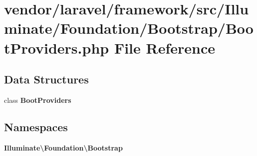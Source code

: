 \section{vendor/laravel/framework/src/\+Illuminate/\+Foundation/\+Bootstrap/\+Boot\+Providers.php File Reference}
\label{_boot_providers_8php}
\subsection*{Data Structures}
\begin{DoxyCompactItemize}
\item 
class {\bf Boot\+Providers}
\end{DoxyCompactItemize}
\subsection*{Namespaces}
\begin{DoxyCompactItemize}
\item 
 {\bf Illuminate\textbackslash{}\+Foundation\textbackslash{}\+Bootstrap}
\end{DoxyCompactItemize}
